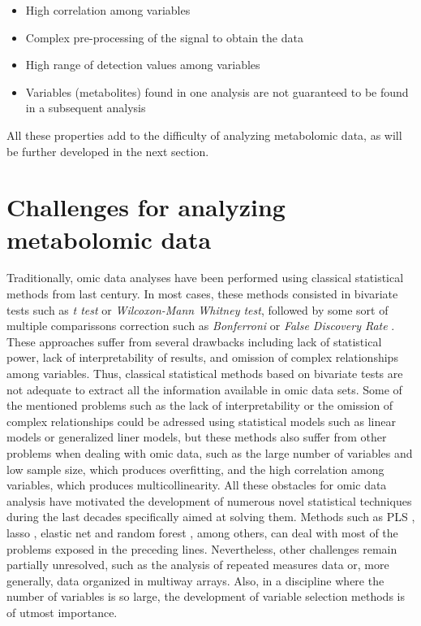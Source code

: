 \begin{itemize}
    \item High correlation among variables
    \item Complex pre-processing of the signal to obtain the data
    \item High range of detection values among variables
    \item Variables (metabolites) found in one analysis are not guaranteed to be found in a subsequent analysis
\end{itemize}

All these properties add to the difficulty of analyzing metabolomic data, as will be further developed in the next section.

\section{Challenges for analyzing metabolomic data}
\label{sec:challengesmetabodata}
Traditionally, omic data analyses have been performed using classical statistical methods from last century. In most cases, these methods consisted in bivariate tests such as \textit{t test} or \textit{Wilcoxon-Mann Whitney test}, followed by some sort of multiple comparissons correction such as \textit{Bonferroni} or \textit{False Discovery Rate} \parencite{hochberg1990more, benjamini1995controlling}. These approaches suffer from several drawbacks including lack of statistical power, lack of interpretability of results, and omission of complex relationships among variables. Thus, classical statistical methods based on bivariate tests are not adequate to extract all the information available in omic data sets.
Some of the mentioned problems such as the lack of interpretability or the omission of complex relationships could be adressed using statistical models such as linear models or generalized liner models, but these methods also suffer from other problems when dealing with omic data, such as the large number of variables and low sample size, which produces overfitting, and the high correlation among variables, which produces multicollinearity. All these obstacles for omic data analysis have motivated the development of numerous novel statistical techniques during the last decades specifically aimed at solving them. Methods such as PLS \parencite{wold1984collinearity}, lasso \parencite{tibshirani1996regression}, elastic net \parencite{zou2005regularization} and random forest \parencite{breiman2001random}, among others, can deal with most of the problems exposed in the preceding lines. Nevertheless, other challenges remain partially unresolved, such as the analysis of repeated measures data or, more generally, data organized in multiway arrays. Also, in a discipline where the number of variables is so large, the development of variable selection methods is of utmost importance.

